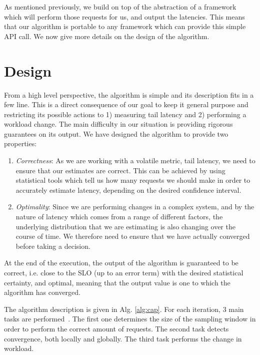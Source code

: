 \documentclass[10pt,conference,compsocconf]{IEEEtran}
\begin{document}
As mentioned previously, we build on top of the abstraction of a framework which will perform those requests for us, and output the latencies. This means that our algorithm is portable to any framework which can provide this simple API call. We now give more details on the design of the algorithm.

\section{Design}\label{design}


From a high level perspective, the algorithm is simple and its description fits in a few line. This is a direct consequence of our goal to keep it general purpose and restricting its possible actions to 1) measuring tail latency and 2) performing a workload change. The main difficulty in our situation is providing rigorous guarantees on its output. We have designed the algorithm to provide two properties:

\begin{enumerate}
	\item \textit{Correctness}: As we are working with a volatile metric, tail latency, we need to ensure that our estimates are correct. This can be achieved by using statistical tools which tell us how many requests we should make in order to accurately estimate latency, depending on the desired confidence interval.

	\item \textit{Optimality}: Since we are performing changes in a complex system, and by the nature of latency which comes from a range of different factors, the underlying distribution that we are estimating is also changing over the course of time. We therefore need to ensure that we have actually converged before taking a decision.
\end{enumerate}

At the end of the execution, the output of the algorithm is guaranteed to be correct, i.e. close to the SLO (up to an error term) with the desired statistical certainty, and optimal, meaning that the output value is one to which the algorithm has converged. 

The algorithm description is given in Alg. \ref{alg:cap}. For each iteration, 3 main tasks are performed . The first one determines the size of the sampling window in order to perform the correct amount of requests. The second task detects convergence, both locally and globally. The third task performs the change in workload.
\end{document}
